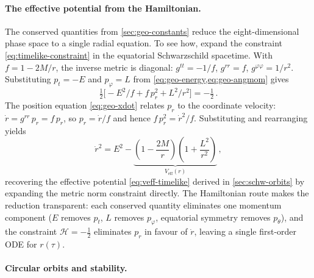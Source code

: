 \paragraph{The effective potential from the Hamiltonian.}

The conserved quantities from \cref{sec:geo-constants} reduce the
eight-dimensional phase space to a single radial equation.  To see
how, expand the constraint \cref{eq:timelike-constraint}
in the equatorial Schwarzschild spacetime.  With $f = 1 - 2M/r$,
the inverse metric is diagonal: $g^{tt} = -1/f$,
$g^{rr} = f$, $g^{\varphi\varphi} = 1/r^2$.  Substituting
$p_t = -E$ and $p_\varphi = L$ from
\cref{eq:geo-energy,eq:geo-angmom} gives
%
\begin{equation}
  \tfrac{1}{2}\bigl[-E^2/f + f\,p_r^2 + L^2/r^2\bigr]
  = -\tfrac{1}{2} \,.
  \label{eq:timelike-H-expanded}
\end{equation}
%
The position equation \cref{eq:geo-xdot} relates $p_r$ to the
coordinate velocity: $\dot{r} = g^{rr}\,p_r = f\,p_r$, so
$p_r = \dot{r}/f$ and hence $f\,p_r^2 = \dot{r}^2/f$.
Substituting and rearranging yields
%
\begin{equation}
  \dot{r}^2 = E^2
  - \underbrace{\left(1 - \frac{2M}{r}\right)
    \!\left(1 + \frac{L^2}{r^2}\right)}_{V_{\text{eff}}(r)} \,,
  \label{eq:timelike-radial}
\end{equation}
%
recovering the effective potential \cref{eq:veff-timelike} derived
in \cref{sec:schw-orbits} by expanding the metric norm
constraint directly.  The Hamiltonian route makes the reduction
transparent: each conserved quantity eliminates one momentum
component ($E$ removes $p_t$, $L$ removes $p_\varphi$, equatorial
symmetry removes $p_\theta$), and the constraint
$\mathcal{H} = -\tfrac{1}{2}$ eliminates $p_r$ in favour of
$\dot{r}$, leaving a single first-order ODE for $r(\tau)$.

\paragraph{Circular orbits and stability.}

